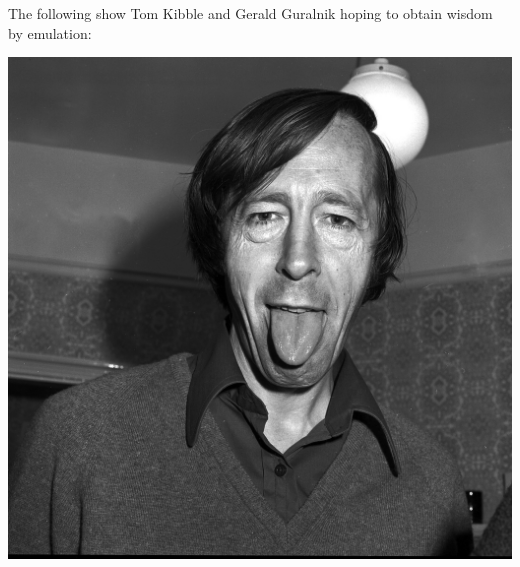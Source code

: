 \documentclass[letterpaper,twoside,preprintnumbers,slac_one]{revtex4}
\begin{document}
The following show Tom Kibble and Gerald Guralnik hoping to obtain wisdom by emulation:

\begin{flushleft}
  \includegraphics[scale=0.10]{tk2.jpg}
\end{flushleft}
\end{document}
